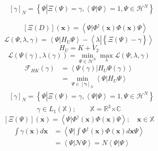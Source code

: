 \documentclass[aps,preprint]{revtex4}%
\begin{document}
\begin{align*}
&  \left[  \gamma\right]  _{N}=\left\{  \left.  \overset{}{\Psi}\right\vert
\Xi\left(  \Psi\right)  =\gamma,\left\langle \left.  \Psi\right\vert
\Psi\right\rangle =1,\Psi\in\mathcal{H}^{N}\right\} \\
& \\
& \\
&  \qquad\left[  \Xi\left(  D\right)  \right]  \left(  \mathbf{x}\right)
=\left\langle \left.  \Psi\right\vert \Phi^{\dagger}\left(  \mathbf{x}\right)
\Phi\left(  \mathbf{x}\right)  \Psi\right\rangle
\end{align*}%
\[
\mathcal{L}\left(  \Psi,\lambda,\gamma\right)  =\left\langle \left.
\Psi\right\vert H_{U}\Psi\right\rangle -\left\langle \lambda\left\vert
\left\{  \overset{}{\Xi\left(  \Psi\right)  -\gamma}\right\}  \right.
\right\rangle
\]%
\[
H_{U}=K+V_{2}%
\]%
\[
\mathcal{L}\left(  \Psi\left(  \gamma\right)  ,\lambda\left(  \gamma\right)
\right)  =\min_{\Psi\in\mathcal{H}^{N}}\max_{\lambda}\mathcal{L}\left(
\Psi,\lambda,\gamma\right)
\]%
\begin{align*}
\mathcal{F}_{HK}\left(  \gamma\right)   &  =\left\langle \Psi\left(
\gamma\right)  \left\vert H_{U}\right.  \Psi\left(  \gamma\right)
\right\rangle \\
&  =\min_{\Psi\in\left[  \mathbf{\gamma}\right]  _{N}}\left\langle
\Psi\left\vert H_{U}\right.  \Psi\right\rangle
\end{align*}%
\begin{align*}
&  \left[  \gamma\right]  _{N}=\left\{  \left.  \overset{}{\Psi}\right\vert
\Xi\left(  \Psi\right)  =\gamma,\left\langle \left.  \Psi\right\vert
\Psi\right\rangle =1,\Psi\in\mathcal{H}^{N}\right\} \\
&  \qquad\qquad\gamma\in L_{1}\left(  \mathbb{X}\right)  ;\qquad
\mathbb{X=R}^{3}\mathbb{\times C}\qquad
\end{align*}%
\[
\left[  \Xi\left(  \Psi\right)  \right]  \left(  \mathbf{x}\right)
=\left\langle \left.  \Psi\right\vert \Phi^{\dagger}\left(  \mathbf{x}\right)
\Phi\left(  \mathbf{x}\right)  \Psi\right\rangle ;\quad\mathbf{x\in}\mathbb{X}%
\]%
\begin{align*}
\int\gamma\left(  \mathbf{x}\right)  d\mathbf{x}  &  \mathbf{=}\left\langle
\left.  \Psi\right\vert \int\Phi^{\dagger}\left(  \mathbf{x}\right)
\Phi\left(  \mathbf{x}\right)  d\mathbf{x}\Psi\right\rangle \\
&  =\left\langle \left.  \Psi\right\vert \mathcal{N}\Psi\right\rangle
=N\left\langle \left.  \Psi\right\vert \Psi\right\rangle
\end{align*}%
\end{document}
